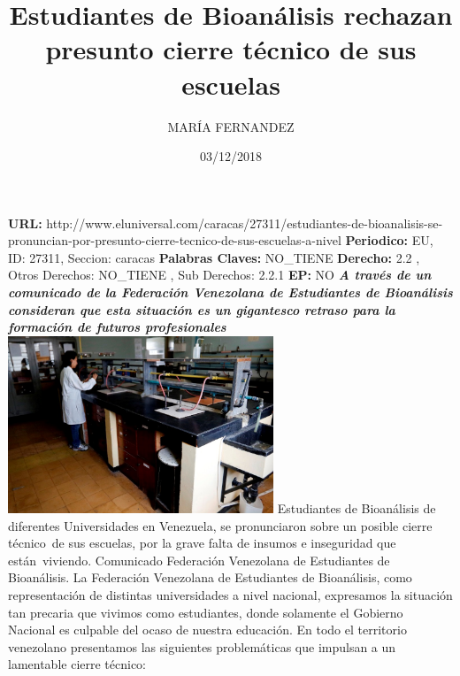 \documentclass{article}%
\title{\textbf{Estudiantes de Bioanálisis rechazan  presunto cierre técnico de sus escuelas}}%
\author{MARÍA FERNANDEZ}%
\date{03/12/2018}%
\begin{document}
%
\normalsize%
\maketitle%
\textbf{URL: }%
http://www.eluniversal.com/caracas/27311/estudiantes{-}de{-}bioanalisis{-}se{-}pronuncian{-}por{-}presunto{-}cierre{-}tecnico{-}de{-}sus{-}escuelas{-}a{-}nivel\newline%
%
\textbf{Periodico: }%
EU, %
ID: %
27311, %
Seccion: %
caracas\newline%
%
\textbf{Palabras Claves: }%
NO\_TIENE\newline%
%
\textbf{Derecho: }%
2.2%
, Otros Derechos: %
NO\_TIENE%
, Sub Derechos: %
2.2.1%
\newline%
%
\textbf{EP: }%
NO\newline%
\newline%
%
\textbf{\textit{A través de un comunicado de la Federación Venezolana de Estudiantes de Bioanálisis consideran que esta situación es un gigantesco retraso para la formación de futuros profesionales}}%
\newline%
\newline%
%
\includegraphics[width=300px]{85.jpg}%
\newline%
%
Estudiantes de Bioanálisis de diferentes Universidades en Venezuela, se pronunciaron sobre un posible cierre técnico~de sus escuelas, por la grave falta de insumos e inseguridad que están~viviendo.%
\newline%
%
Comunicado Federación Venezolana de Estudiantes de Bioanálisis.%
\newline%
%
La Federación Venezolana de Estudiantes de Bioanálisis, como representación de distintas universidades a nivel nacional, expresamos la situación tan precaria que vivimos como estudiantes, donde solamente el Gobierno Nacional es culpable del ocaso de nuestra educación. En todo el territorio venezolano presentamos las siguientes problemáticas que impulsan a un lamentable cierre técnico:%
\newline%
\end{document}
